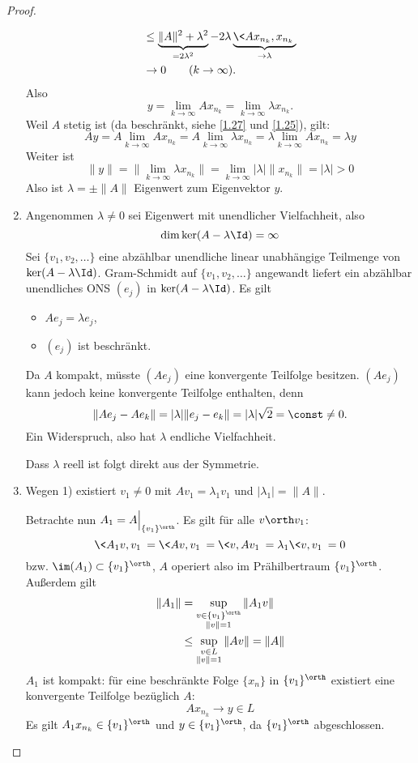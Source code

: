 \begin{st}
\begin{proof}
\begin{enumerate}[1)]
\begin{align*}
					&\le \underbrace{\|A\|^2 + \lambda^2}_{=2\lambda^2} - 2 \lambda \underbrace{\<Ax_{n_k}, x_{n_k}\>}_{\to \lambda} \\
					& \to 0 \qquad (k\to \infty).
				\end{align*}
				Also 
				\[
					y = \lim_{k\to \infty} Ax_{n_k} = \lim_{k\to \infty} \lambda x_{n_k}.
				\]
				Weil $A$ stetig ist (da beschränkt, siehe \ref{1.27} und \ref{1.25}), gilt:
				\[
					Ay 
					= A \lim_{k\to\infty} A x_{n_k} 
					= A \lim_{k\to\infty} \lambda x_{n_k}
					= \lambda \lim_{k\to\infty} Ax_{n_k}
					= \lambda y
				\]
				Weiter ist
				\[
					\|y\| 
					= \Big\|\lim_{k\to\infty} \lambda x_{n_k}\Big\|
					= \lim_{k\to\infty} |\lambda| \|x_{n_k}\|
					= |\lambda|
					> 0
				\]
				Also ist $\lambda = \pm \|A\|$ Eigenwert zum Eigenvektor $y$. 
			\item

				Angenommen $\lambda \neq 0$ sei Eigenwert mit unendlicher Vielfachheit, also
				\[
					\dim \ker (A - \lambda \Id) = \infty
				\]
				Sei $\{v_1,v_2,\dotsc\}$ eine abzählbar unendliche linear unabhängige Teilmenge von $\ker(A-\lambda \Id)$.
				Gram-Schmidt auf $\{v_1,v_2,\dotsc\}$ angewandt liefert ein abzählbar unendliches ONS $(e_j)$ in $\ker (A-\lambda \Id)$.
				Es gilt
				\begin{itemize}
					\item
						$Ae_j = \lambda e_j$,
					\item
						$(e_j)$ ist beschränkt.
				\end{itemize}
				Da $A$ kompakt, müsste $(Ae_j)$ eine konvergente Teilfolge besitzen.
				$(Ae_j)$ kann jedoch keine konvergente Teilfolge enthalten, denn
				\[
					\|Ae_j - Ae_k\| = |\lambda| \|e_j-e_k\| = |\lambda| \sqrt 2 = \const \neq 0.
				\]
				Ein Widerspruch, also hat $\lambda$ endliche Vielfachheit.

				Dass $\lambda$ reell ist folgt direkt aus der Symmetrie.
			\item
				Wegen 1) existiert $v_1 \neq 0$ mit $Av_1 = \lambda_1v_1$ und $|\lambda_1| = \|A\|$.

				Betrachte nun $A_1 = A \Big|_{\{v_1\}^\orth}$.
				Es gilt für alle $v \orth v_1$:
				\[
					\<A_1v,v_1\> = \<Av,v_1\> = \<v,Av_1\> = \lambda_1\<v,v_1\> = 0
				\]
				bzw. $\im (A_1) \subset \{v_1\}^\orth$, $A$ operiert also im Prähilbertraum $\{v_1\}^\orth$.
				Außerdem gilt
				\begin{align*}
					\|A_1\| 
					&= \sup_{\substack{v\in \{v_1\}^\orth \\ \|v\|=1}} \|A_1 v\| \\
					&\le \sup_{\substack{v\in L \\ \|v\|=1}} \|A v\| 
					= \|A\|
				\end{align*}
				$A_1$ ist kompakt: für eine beschränkte Folge $\{x_n\}$ in $\{v_1\}^\orth$ existiert eine konvergente Teilfolge bezüglich $A$:
				\[
					A x_{n_k} \to y \in L
				\]
				Es gilt $A_1 x_{n_k} \in \{v_1\}^\orth$ und $y \in \{v_1\}^\orth$, da $\{v_1\}^\orth$ abgeschlossen.


\end{enumerate}
\end{proof}
\end{st}
